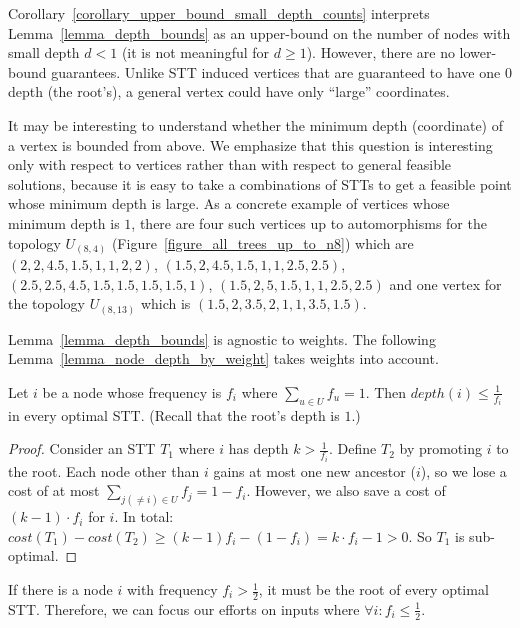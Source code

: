 \begin{remark} 
Corollary~\ref{corollary_upper_bound_small_depth_counts} interprets Lemma~\ref{lemma_depth_bounds} as an upper-bound on the number of nodes with small depth $d < 1$ (it is not meaningful for $d \ge 1$). However, there are no lower-bound guarantees. Unlike STT induced vertices that are guaranteed to have one $0$ depth (the root's), a general vertex could have only ``large'' coordinates.

It may be interesting to understand whether the minimum depth (coordinate) of a vertex is bounded from above. We emphasize that this question is interesting only with respect to vertices rather than with respect to general feasible solutions, because it is easy to take a combinations of STTs to get a feasible point whose minimum depth is large. As a concrete example of vertices whose minimum depth is $1$, there are four such vertices up to automorphisms for the topology $U_{(8,4)}$ (Figure~\ref{figure_all_trees_up_to_n8}) which are $(2, 2, 4.5, 1.5, 1, 1, 2, 2)$, $(1.5, 2, 4.5, 1.5, 1, 1, 2.5, 2.5)$, $(2.5, 2.5, 4.5, 1.5, 1.5, 1.5, 1.5, 1)$, $(1.5, 2, 5, 1.5, 1, 1, 2.5, 2.5)$ and one vertex for the topology $U_{(8,13)}$ which is $(1.5, 2, 3.5, 2, 1, 1, 3.5, 1.5)$.
\end{remark}

Lemma~\ref{lemma_depth_bounds} is agnostic to weights. The following Lemma~\ref{lemma_node_depth_by_weight} takes weights into account.

\begin{lemma}
\label{lemma_node_depth_by_weight}
Let $i$ be a node whose frequency is $f_i$ where $\sum_{u \in U}{f_u} = 1$. Then $depth(i) \le \frac{1}{f_i}$ in every optimal STT. (Recall that the root's depth is $1$.)
\end{lemma}
\begin{proof}
Consider an STT $T_1$ where $i$ has depth $k > \frac{1}{f_i}$. Define $T_2$ by promoting $i$ to the root. Each node other than $i$ gains at most one new ancestor ($i$), so we lose a cost of at most $\sum_{j (\ne i) \in U}{f_j} = 1 - f_i$. However, we also save a cost of $(k-1) \cdot f_i$ for $i$. In total: $cost(T_1) - cost(T_2) \ge (k-1) f_i - (1- f_i) = k \cdot f_i - 1 > 0$. So $T_1$ is sub-optimal.
\end{proof}

\begin{corollary}
If there is a node $i$ with frequency $f_i > \frac{1}{2}$, it must be the root of every optimal STT. Therefore, we can focus our efforts on inputs where $\forall i: f_i \le \frac{1}{2}$. 
\end{corollary}



